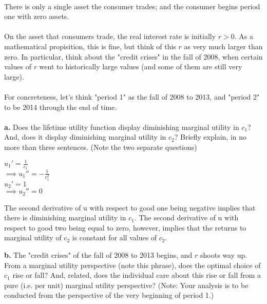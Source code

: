 \documentclass[11pt]{SelfArxOneColBMN}
\begin{document}
\\
There is only a single asset the consumer trades; and the consumer begins period one with zero assets.\\
\\
On the asset that consumers trade, the real interest rate is initially $r > 0$. As a mathematical propisition, this is fine, but think of this $r$ as very much larger than zero. In particular, think about the "credit crises" in the fall of 2008, when certain values of $r$ went to historically large values (and some of them are still very large).\\
\\
For concreteness, let's think "period 1" as the fall of 2008 to 2013, and "period 2" to be 2014 through the end of time.\\
\\
\noindent \textbf{a.} Does the lifetime utility function display diminishing marginal utility in $c_1$? And, does it display diminishing marginal utility in $c_2$? Briefly explain, in no more than three sentences. (Note the two separate questions)\\
\begin{solution}
  \begin{center}
    $u_1' = \frac{1}{c_1}$\\
    $\implies u_1'' = -\frac{1}{c_1^2}$\\
    $u_2' = 1$\\
    $\implies u_2'' = 0$
  \end{center}
  The second derivative of u with respect to good one being negative implies that there is diminishing marginal utility in $c_1$. The second derivative of u with respect to good two being equal to zero, however, implies that the returns to marginal utility of $c_2$ is constant for all values of $c_2$.
\end{solution}
\noindent \textbf{b.} The "credit crises" of the fall of 2008 to 2013 begins, and $r$ shoots way up. From a marginal utility perspective (note this phrase), does the optimal choice of $c_1$ rise or fall? And, related, does the individual care about this rise or fall from a pure (i.e. per unit) marginal utility perspective? (Note: Your analysis is to be conducted from the perspective of the very beginning of period 1.)\\
\end{document}
